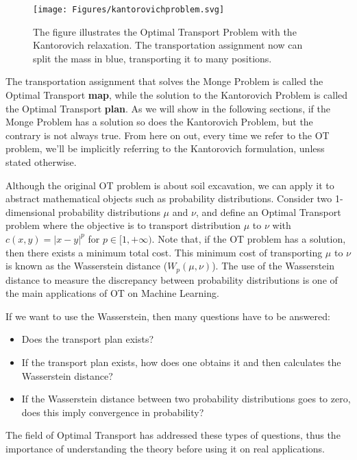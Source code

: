 \begin{figure}[H]
  \centering
  
  \texttt{[image: Figures/kantorovichproblem.svg]}
  \caption{The figure illustrates the Optimal Transport Problem with the Kantorovich relaxation.
  The transportation assignment now can split the mass in blue, transporting it to many positions.}
  \label{fig:kantorovichproblem}
\end{figure}

The transportation assignment that solves the Monge Problem is called the Optimal Transport \textbf{map},
while the solution to the Kantorovich Problem is called the Optimal Transport \textbf{plan}. As we will show
in the following sections, if the Monge Problem has a solution so does the Kantorovich Problem,
but the contrary is not always true. From here
on out, every time we refer to the OT problem, we'll be implicitly referring to the Kantorovich formulation, unless
stated otherwise.

Although the original OT problem is about soil excavation, we can apply it to abstract mathematical objects
such as probability distributions. Consider two 1-dimensional probability distributions
$\mu$ and $\nu$, and define an Optimal Transport problem where the objective is to transport
distribution $\mu$ to $\nu$ with $c(x,y) = |x-y|^p$ for $p \in [1,+\infty)$.
Note that, if the OT problem has a solution, then there exists a minimum total cost. This minimum
cost of transporting $\mu$ to $\nu$ is known as the Wasserstein distance ($W_p(\mu,\nu)$).
The use of the Wasserstein distance to measure the discrepancy between probability distributions
is one of the main applications of OT on Machine Learning.

If we want to use the Wasserstein, then many questions have to be answered:
\begin{itemize}
  \item Does the transport plan exists?
  \item If the transport plan exists, how does one obtains it and then calculates the Wasserstein distance?
  \item If the Wasserstein distance between two probability distributions goes to zero,
  does this imply convergence in probability?
\end{itemize}

The field of Optimal Transport has addressed these types of questions, thus the importance of understanding
the theory before using it on real applications.

